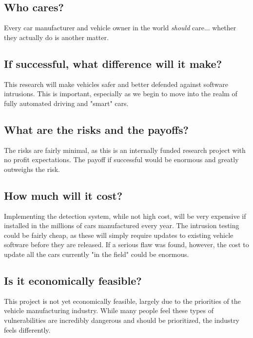\documentclass[9pt]{article}
\begin{document}
\subsection*{Who cares?}
Every car manufacturer and vehicle owner in the world \emph{should} care... whether they actually do is another matter.
\subsection*{If successful, what difference will it make?}
This research will make vehicles safer and better defended against software intrusions. This is important, especially as we begin
to move into the realm of fully automated driving and "smart" cars.
\subsection*{What are the risks and the payoffs?}
The risks are fairly minimal, as this is an internally funded research project with no profit expectations.
The payoff if successful would be enormous and greatly outweighs the risk.
\subsection*{How much will it cost?}
Implementing the detection system, while not high cost, will be very expensive if installed in the millions of cars manufactured 
every year. The intrusion testing could be fairly cheap, as these will simply require updates to existing vehicle software before
they are released. If a serious flaw was found, however, the cost to update all the cars currently "in the field" could be enormous.
\subsection*{Is it economically feasible?}
This project is not yet economically feasible, largely due to the priorities of the vehicle manufacturing industry. While
many people feel these types of vulnerabilities are incredibly dangerous and should be prioritized, the industry feels differently.
\end{document}
